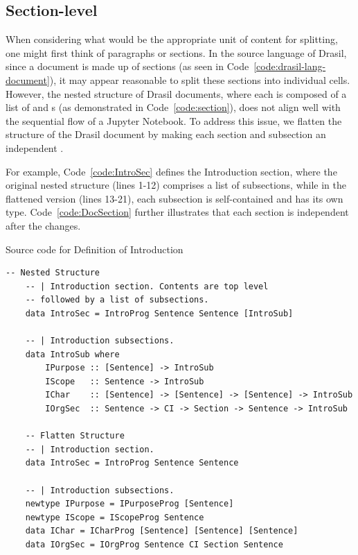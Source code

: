\subsection{Section-level}
When considering what would be the appropriate unit of content for splitting, 
one might first think of paragraphs or sections. In the source language of 
Drasil, since a document is made up of sections (as seen in 
Code~\ref{code:drasil-lang-document}), it may appear reasonable to split these 
sections into individual cells. However, the nested structure of Drasil 
documents, where each  is composed of a list of 
 and s (as demonstrated in 
Code~\ref{code:section}), does not align well with the sequential flow of a 
Jupyter Notebook. To address this issue, we flatten the structure of the Drasil 
document by making each section and subsection an independent 
. 

For example, Code~\ref{code:IntroSec} defines the Introduction section, where 
the original nested structure (lines 1-12) comprises a list of subsections, 
while in the flattened version (lines 13-21), each subsection is self-contained 
and has its own type. Code~\ref{code:DocSection} further illustrates that each 
section is independent after the changes.

\begin{listing}[h]
	\caption{Source code for Definition of Introduction}
	\label{code:IntroSec}
	\begin{lstlisting}[language=haskell1]
	-- Nested Structure
	-- | Introduction section. Contents are top level 
	-- followed by a list of subsections.
	data IntroSec = IntroProg Sentence Sentence [IntroSub]
		
	-- | Introduction subsections.
	data IntroSub where
		IPurpose :: [Sentence] -> IntroSub
		IScope   :: Sentence -> IntroSub
		IChar    :: [Sentence] -> [Sentence] -> [Sentence] -> IntroSub
		IOrgSec  :: Sentence -> CI -> Section -> Sentence -> IntroSub
	
	-- Flatten Structure
	-- | Introduction section.
	data IntroSec = IntroProg Sentence Sentence
	
	-- | Introduction subsections.
	newtype IPurpose = IPurposeProg [Sentence] 
	newtype IScope = IScopeProg Sentence 
	data IChar = ICharProg [Sentence] [Sentence] [Sentence]
	data IOrgSec = IOrgProg Sentence CI Section Sentence
	\end{lstlisting}
\end{listing}

